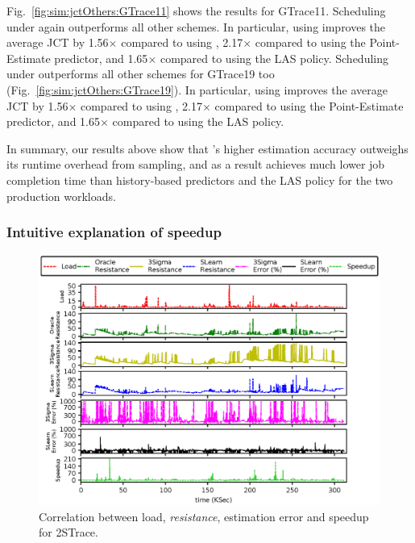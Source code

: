 Fig.~\ref{fig:sim:jctOthers:GTrace11} shows the results for GTrace11.  
Scheduling under \slearn again outperforms all other schemes. In particular,
using \slearn improves the average JCT by 1.56$\times$ compared to using
\primarybasepredict, 2.17$\times$ compared to using the Point-Estimate
predictor, and 1.65$\times$ compared to using the LAS policy.
Scheduling under \slearn outperforms all other schemes for GTrace19 too
(Fig.~\ref{fig:sim:jctOthers:GTrace19}). In particular, using \slearn improves
the average JCT by 1.56$\times$ compared to using \primarybasepredict,
2.17$\times$ compared to using the Point-Estimate predictor, and 1.65$\times$
compared to using the LAS policy.

In summary, our results above show that \slearn's higher estimation accuracy
outweighs its runtime overhead from sampling, and as a result achieves much
lower job completion time than history-based predictors and the LAS policy for
the two production workloads.


\subsubsection{Intuitive explanation of speedup}
\label{sec:sim:intuitionSpeedup}

\begin{figure}
	\includegraphics[width=1.0\linewidth]{figures/simulation/2STrace-Trial.eps}
	\caption{Correlation between load, \textit{resistance}, estimation error and speedup for 2STrace. }
	\label{figs:sim:intuitionSpeedup:allInOne}
\end{figure}

